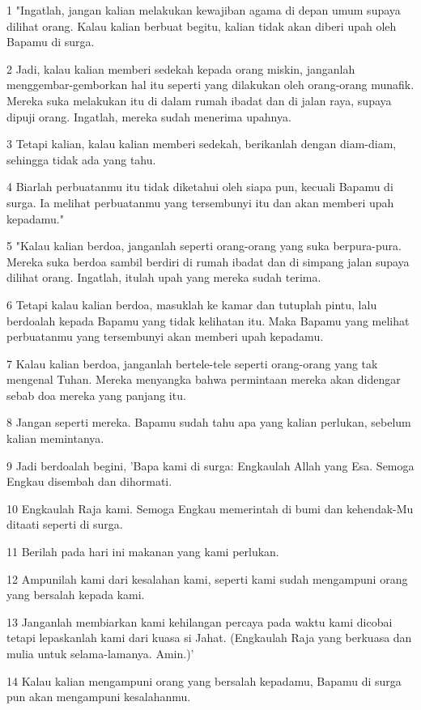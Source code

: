 \par 1 "Ingatlah, jangan kalian melakukan kewajiban agama di depan umum supaya dilihat orang. Kalau kalian berbuat begitu, kalian tidak akan diberi upah oleh Bapamu di surga.
\par 2 Jadi, kalau kalian memberi sedekah kepada orang miskin, janganlah menggembar-gemborkan hal itu seperti yang dilakukan oleh orang-orang munafik. Mereka suka melakukan itu di dalam rumah ibadat dan di jalan raya, supaya dipuji orang. Ingatlah, mereka sudah menerima upahnya.
\par 3 Tetapi kalian, kalau kalian memberi sedekah, berikanlah dengan diam-diam, sehingga tidak ada yang tahu.
\par 4 Biarlah perbuatanmu itu tidak diketahui oleh siapa pun, kecuali Bapamu di surga. Ia melihat perbuatanmu yang tersembunyi itu dan akan memberi upah kepadamu."
\par 5 "Kalau kalian berdoa, janganlah seperti orang-orang yang suka berpura-pura. Mereka suka berdoa sambil berdiri di rumah ibadat dan di simpang jalan supaya dilihat orang. Ingatlah, itulah upah yang mereka sudah terima.
\par 6 Tetapi kalau kalian berdoa, masuklah ke kamar dan tutuplah pintu, lalu berdoalah kepada Bapamu yang tidak kelihatan itu. Maka Bapamu yang melihat perbuatanmu yang tersembunyi akan memberi upah kepadamu.
\par 7 Kalau kalian berdoa, janganlah bertele-tele seperti orang-orang yang tak mengenal Tuhan. Mereka menyangka bahwa permintaan mereka akan didengar sebab doa mereka yang panjang itu.
\par 8 Jangan seperti mereka. Bapamu sudah tahu apa yang kalian perlukan, sebelum kalian memintanya.
\par 9 Jadi berdoalah begini, 'Bapa kami di surga: Engkaulah Allah yang Esa. Semoga Engkau disembah dan dihormati.
\par 10 Engkaulah Raja kami. Semoga Engkau memerintah di bumi dan kehendak-Mu ditaati seperti di surga.
\par 11 Berilah pada hari ini makanan yang kami perlukan.
\par 12 Ampunilah kami dari kesalahan kami, seperti kami sudah mengampuni orang yang bersalah kepada kami.
\par 13 Janganlah membiarkan kami kehilangan percaya pada waktu kami dicobai tetapi lepaskanlah kami dari kuasa si Jahat. (Engkaulah Raja yang berkuasa dan mulia untuk selama-lamanya. Amin.)'
\par 14 Kalau kalian mengampuni orang yang bersalah kepadamu, Bapamu di surga pun akan mengampuni kesalahanmu.
